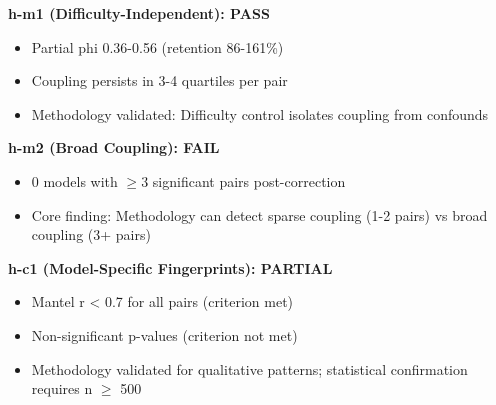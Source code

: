 \textbf{h-m1 (Difficulty-Independent): PASS}
\begin{itemize}
\item Partial phi 0.36-0.56 (retention 86-161\%)
\item Coupling persists in 3-4 quartiles per pair
\item Methodology validated: Difficulty control isolates coupling from confounds
\end{itemize}

\textbf{h-m2 (Broad Coupling): FAIL}
\begin{itemize}
\item 0 models with $\geq 3$ significant pairs post-correction
\item Core finding: Methodology can detect sparse coupling (1-2 pairs) vs broad coupling (3+ pairs)
\end{itemize}

\textbf{h-c1 (Model-Specific Fingerprints): PARTIAL}
\begin{itemize}
\item Mantel r < 0.7 for all pairs (criterion met)
\item Non-significant p-values (criterion not met)
\item Methodology validated for qualitative patterns; statistical confirmation requires n $\geq$ 500
\end{itemize}
